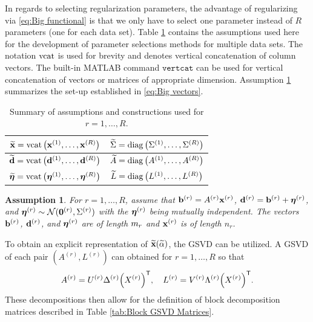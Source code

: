 \documentclass[12pt]{article}
\newtheorem{assumption}{Assumption}
\begin{document}
In regards to selecting regularization parameters, the advantage of regularizing via \eqref{eq:Big functional} is that we only have to select one parameter instead of $R$ parameters (one for each data set). Table \ref{tab:System assumptions} contains the assumptions used here for the development of parameter selections methods for multiple data sets. The notation $\operatorname{vcat}$ is used for brevity and denotes vertical concatenation of column vectors. The built-in MATLAB command $\mathtt{vertcat}$ can be used for vertical concatenation of vectors or matrices of appropriate dimension. Assumption \ref{Assumption_System} summarizes the set-up established in \eqref{eq:Big vectors}.

\begin{table}[ht!]
  \begin{center}
    \caption{Summary of assumptions and constructions used for $r = 1,\ldots,R$.}
    \label{tab:System assumptions}
    \begin{tabular}{|c|c|}
    \hline
    $\widetilde{\mathbf{x}} = \operatorname{vcat}\left(\mathbf{x}^{(1)},\ldots,\mathbf{x}^{(R)}\right)$ & $\widetilde{\Sigma} = \operatorname{diag}\left(\Sigma^{(1)},\ldots,\Sigma^{(R)}\right)$ \\
    \hline
    $\widetilde{\mathbf{d}} = \operatorname{vcat}\left(\mathbf{d}^{(1)},\ldots,\mathbf{d}^{(R)}\right)$ & $\widetilde{A} = \operatorname{diag}\left(A^{(1)},\ldots,A^{(R)}\right)$ \\
    \hline
    $\widetilde{\bm{\eta}} = \operatorname{vcat}\left(\bm{\eta}^{(1)},\ldots,\bm{\eta}^{(R)}\right)$ & $\widetilde{L} = \operatorname{diag}\left(L^{(1)},\ldots,L^{(R)}\right)$ \\
    \hline
    \end{tabular}
  \end{center}
\end{table}

\begin{assumption}
\label{Assumption_System}
For $r = 1,\ldots,R$, assume that $\mathbf{b}^{(r)} = {A^{(r)}}\mathbf{x}^{(r)}$, $\mathbf{d}^{(r)} = \mathbf{b}^{(r)} + \bm{\eta}^{(r)}$, and $\bm{\eta}^{(r)} \sim \mathcal{N}(\bm{0}^{(r)},\Sigma^{(r)})$ with the $\bm{\eta}^{(r)}$ being mutually independent. The vectors $\mathbf{b}^{(r)}$, $\mathbf{d}^{(r)}$, and $\bm{\eta}^{(r)}$ are of length $m_r$ and $\mathbf{x}^{(r)}$ is of length $n_r$.
\end{assumption}

To obtain an explicit representation of $\widetilde{\mathbf{x}}(\widetilde{\alpha})$, the GSVD can be utilized. A GSVD of each pair $(A^{(r)},L^{(r)})$ can obtained for $r = 1,\ldots,R$ so that
\begin{equation}
\label{eq:Mulitple GSVD}
    A^{(r)} = U^{(r)}\Delta^{(r)}{\left(X^{(r)}\right)}^\mathsf{T}, \quad L^{(r)} = V^{(r)}\Lambda^{(r)}{\left(X^{(r)}\right)}^\mathsf{T}.
\end{equation}
These decompositions then allow for the definition of block decomposition matrices described in Table \ref{tab:Block GSVD Matrices}.
\end{document}
